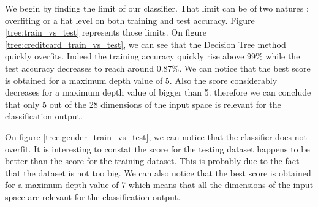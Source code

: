 \documentclass[10pt]{article}
\begin{document}
		We begin by finding the limit of our classifier. That limit can be of two natures : overfiting or a flat level on both training and test accuracy. Figure \ref{tree:train_vs_test} represents those limits. On figure \ref{tree:creditcard_train_vs_test}, we can see that the Decision Tree method quickly overfits. Indeed the training accuracy quickly rise above 99\% while the test accuracy decreases to reach around 0.87\%. We can notice that the best score is obtained for a maximum depth value of 5. Also the score considerably decreases for a maximum depth value of bigger than 5. therefore we can conclude that only 5 out of the 28 dimensions of the input space is relevant for the classification output.

		On figure \ref{tree:gender_train_vs_test}, we can notice that the classifier does not overfit. It is interesting to constat the score for the testing dataset happens to be better than the score for the training dataset. This is probably due to the fact that the dataset is not too big. We can also notice that the best score is obtained for a maximum depth value of 7 which means that all the dimensions of the input space are relevant for the classification output.
\end{document}
